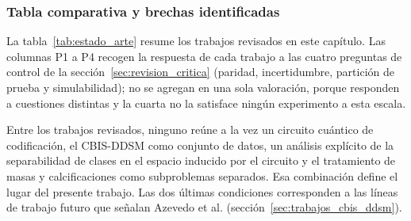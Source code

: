 
\subsubsection{Tabla comparativa y brechas identificadas}

La tabla~\ref{tab:estado_arte} resume los trabajos revisados en este capítulo. Las columnas P1 a P4 recogen la respuesta de cada trabajo a las cuatro preguntas de control de la sección~\ref{sec:revision_critica} (paridad, incertidumbre, partición de prueba y simulabilidad); no se agregan en una sola valoración, porque responden a cuestiones distintas y la cuarta no la satisface ningún experimento a esta escala.

Entre los trabajos revisados, ninguno reúne a la vez un circuito cuántico de codificación, el CBIS-DDSM como conjunto de datos, un análisis explícito de la separabilidad de clases en el espacio inducido por el circuito y el tratamiento de masas y calcificaciones como subproblemas separados. Esa combinación define el lugar del presente trabajo. Las dos últimas condiciones corresponden a las líneas de trabajo futuro que señalan Azevedo et al. (sección~\ref{sec:trabajos_cbis_ddsm}).

